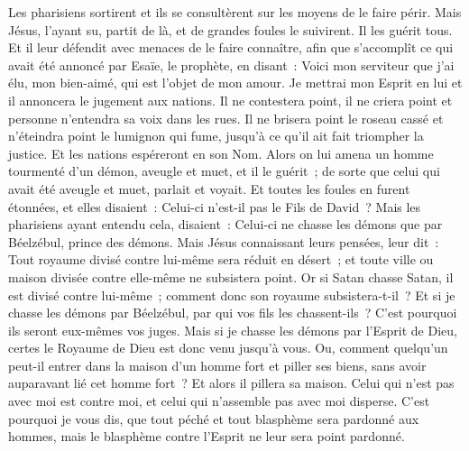\begin{multicols}{2}
Les pharisiens sortirent et ils se consultèrent sur les moyens de le faire périr.
Mais Jésus, l'ayant su, partit de là, et de grandes foules le suivirent. Il les guérit tous.
Et il leur défendit avec menaces de le faire connaître,
afin que s'accomplît ce qui avait été annoncé par Esaïe, le prophète, en disant~:
Voici mon serviteur que j'ai élu, mon bien-aimé, qui est l'objet de mon amour. Je mettrai mon Esprit en lui et il annoncera le jugement aux nations.
Il ne contestera point, il ne criera point et personne n'entendra sa voix dans les rues.
Il ne brisera point le roseau cassé et n'éteindra point le lumignon qui fume, jusqu'à ce qu'il ait fait triompher la justice.
Et les nations espéreront en son Nom.
Alors on lui amena un homme tourmenté d'un démon, aveugle et muet, et il le guérit~; de sorte que celui qui avait été aveugle et muet, parlait et voyait.
Et toutes les foules en furent étonnées, et elles disaient~: Celui-ci n'est-il pas le Fils de David~?
Mais les pharisiens ayant entendu cela, disaient~: Celui-ci ne chasse les démons que par Béelzébul, prince des démons.
Mais Jésus connaissant leurs pensées, leur dit~: Tout royaume divisé contre lui-même sera réduit en désert~; et toute ville ou maison divisée contre elle-même ne subsistera point.
Or si Satan chasse Satan, il est divisé contre lui-même~; comment donc son royaume subsistera-t-il~?
Et si je chasse les démons par Béelzébul, par qui vos fils les chassent-ils~? C'est pourquoi ils seront eux-mêmes vos juges.
Mais si je chasse les démons par l'Esprit de Dieu, certes le Royaume de Dieu est donc venu jusqu'à vous.
Ou, comment quelqu'un peut-il entrer dans la maison d'un homme fort et piller ses biens, sans avoir auparavant lié cet homme fort~? Et alors il pillera sa maison.
Celui qui n'est pas avec moi est contre moi, et celui qui n'assemble pas avec moi disperse.
C'est pourquoi je vous dis, que tout péché et tout blasphème sera pardonné aux hommes, mais le blasphème contre l'Esprit ne leur sera point pardonné.

\end{multicols}
